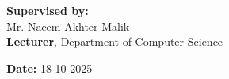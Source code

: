 \begin{titlepage}
{\begin{minipage}[c][0.95\textheight]{0.95\textwidth}
			\vspace{1.0cm}
			
			\begin{flushleft}
				\textbf{Supervised by:}\\[0.25cm]
				Mr. Naeem Akhter Malik\\
				\textbf{Lecturer}, Department of Computer Science
			\end{flushleft}
			
			\vfill %
			
			\begin{flushleft}
				\textbf{Date:} 18-10-2025
			\end{flushleft}
			
			\vspace{0.5cm}
			
	\end{minipage}}
	
	\restoregeometry
	
\end{titlepage}

